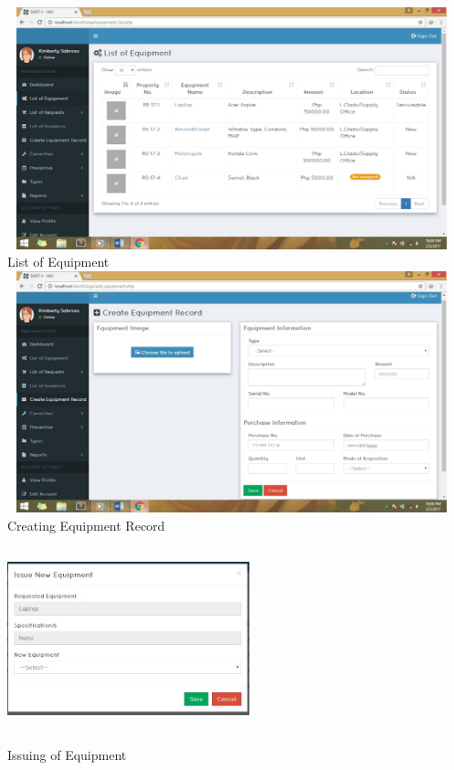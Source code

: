 \begin{center}
\begin{center}
	\includegraphics[width=13cm,height=7cm]{image/d3-10.jpg}\\
	List of Equipment \\
	\includegraphics[width=13cm,height=7cm]{image/d3-11.jpg}\\
	Creating Equipment Record\\
	\vspace{1cm}
	\includegraphics[width=7cm,height=6cm]{image/d3-12.jpg}\\
	Issuing of Equipment\\
	\vspace{1cm}

\end{center}
\end{center}

